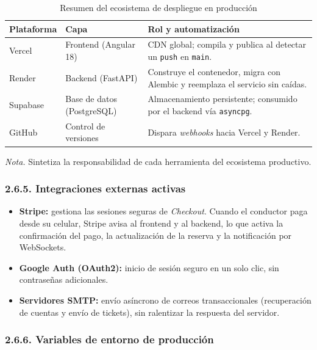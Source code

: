 \begin{table}[htbp]
\caption{Resumen del ecosistema de despliegue en producción}
\label{tab:ecosistema_prod}
\begin{tabular}{@{}p{2.5cm} p{4cm} p{8cm}@{}}
\toprule
\textbf{Plataforma} & \textbf{Capa} & \textbf{Rol y automatización} \\
\midrule
Vercel & Frontend (Angular 18) & CDN global; compila y publica al detectar un \texttt{push} en \texttt{main}. \\
Render & Backend (FastAPI) & Construye el contenedor, migra con Alembic y reemplaza el servicio sin caídas. \\
Supabase & Base de datos (PostgreSQL) & Almacenamiento persistente; consumido por el backend vía \texttt{asyncpg}. \\
GitHub & Control de versiones & Dispara \textit{webhooks} hacia Vercel y Render. \\
\bottomrule
\end{tabular}
\par\vspace{0.2cm}
\textit{Nota.} Sintetiza la responsabilidad de cada herramienta del ecosistema productivo.
\end{table}

\subsubsection{2.6.5. Integraciones externas activas}

\begin{itemize}
  \item \textbf{Stripe:} gestiona las sesiones seguras de \textit{Checkout}. Cuando el conductor paga desde su celular, Stripe avisa al frontend y al backend, lo que activa la confirmación del pago, la actualización de la reserva y la notificación por WebSockets.
  \item \textbf{Google Auth (OAuth2):} inicio de sesión seguro en un solo clic, sin contraseñas adicionales.
  \item \textbf{Servidores SMTP:} envío asíncrono de correos transaccionales (recuperación de cuentas y envío de tickets), sin ralentizar la respuesta del servidor.
\end{itemize}

\subsubsection{2.6.6. Variables de entorno de producción}

